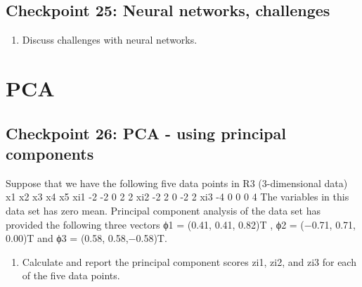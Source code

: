 \documentclass[
  letterpaper,
  DIV=11,
  numbers=noendperiod]{scrartcl}
\providecommand{\tightlist}{%
  \setlength{\itemsep}{0pt}\setlength{\parskip}{0pt}}\usepackage{longtable,booktabs,array}
\begin{document}
\hypertarget{checkpoint-25-neural-networks-challenges}{%
\subsection{Checkpoint 25: Neural networks,
challenges}\label{checkpoint-25-neural-networks-challenges}}

\begin{enumerate}
\def\labelenumi{(\alph{enumi})}
\tightlist
\item
  Discuss challenges with neural networks.
\end{enumerate}

\hypertarget{pca}{%
\section{PCA}\label{pca}}

\hypertarget{checkpoint-26-pca---using-principal-components}{%
\subsection{Checkpoint 26: PCA - using principal
components}\label{checkpoint-26-pca---using-principal-components}}

Suppose that we have the following five data points in R3 (3-dimensional
data) x1 x2 x3 x4 x5 xi1 -2 -2 0 2 2 xi2 -2 2 0 -2 2 xi3 -4 0 0 0 4 The
variables in this data set has zero mean. Principal component analysis
of the data set has provided the following three vectors ϕ1 = (0.41,
0.41, 0.82)T , ϕ2 = (−0.71, 0.71, 0.00)T and ϕ3 = (0.58, 0.58,−0.58)T.

\begin{enumerate}
\def\labelenumi{(\alph{enumi})}
\tightlist
\item
  Calculate and report the principal component scores zi1, zi2, and zi3
  for each of the five data points.
\end{enumerate}
\end{document}
